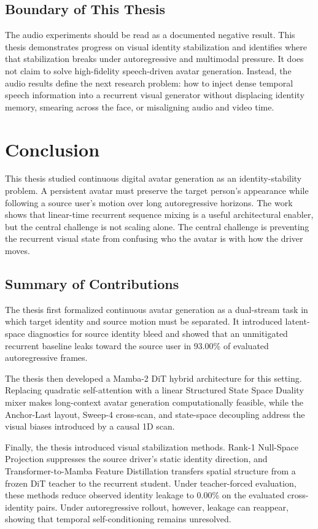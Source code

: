 \documentclass[12pt,letterpaper]{report}
\begin{document}
\section{Boundary of This Thesis}

The audio experiments should be read as a documented negative result. This thesis demonstrates progress on visual identity stabilization and identifies where that stabilization breaks under autoregressive and multimodal pressure. It does not claim to solve high-fidelity speech-driven avatar generation. Instead, the audio results define the next research problem: how to inject dense temporal speech information into a recurrent visual generator without displacing identity memory, smearing across the face, or misaligning audio and video time.

\chapter{Conclusion}

This thesis studied continuous digital avatar generation as an identity-stability problem. A persistent avatar must preserve the target person's appearance while following a source user's motion over long autoregressive horizons. The work shows that linear-time recurrent sequence mixing is a useful architectural enabler, but the central challenge is not scaling alone. The central challenge is preventing the recurrent visual state from confusing who the avatar is with how the driver moves.

\section{Summary of Contributions}

The thesis first formalized continuous avatar generation as a dual-stream task in which target identity and source motion must be separated. It introduced latent-space diagnostics for source identity bleed and showed that an unmitigated recurrent baseline leaks toward the source user in 93.00\% of evaluated autoregressive frames.

The thesis then developed a Mamba-2 DiT hybrid architecture for this setting. Replacing quadratic self-attention with a linear Structured State Space Duality mixer makes long-context avatar generation computationally feasible, while the Anchor-Last layout, Sweep-4 cross-scan, and state-space decoupling address the visual biases introduced by a causal 1D scan.

Finally, the thesis introduced visual stabilization methods. Rank-1 Null-Space Projection suppresses the source driver's static identity direction, and Transformer-to-Mamba Feature Distillation transfers spatial structure from a frozen DiT teacher to the recurrent student. Under teacher-forced evaluation, these methods reduce observed identity leakage to 0.00\% on the evaluated cross-identity pairs. Under autoregressive rollout, however, leakage can reappear, showing that temporal self-conditioning remains unresolved.
\end{document}
